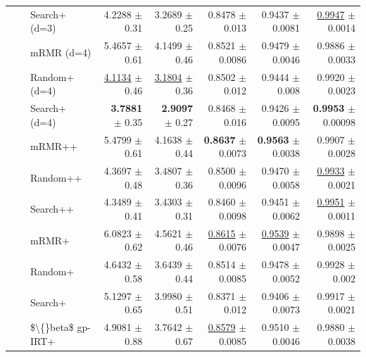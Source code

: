 \begin{longtable}{llp{}rrrrr}
 &  & Search+ (d=3) & 4.2288 {\scriptsize $\pm$ 0.31} & 3.2689 {\scriptsize $\pm$ 0.25} & 0.8478 {\scriptsize $\pm$ 0.013} & 0.9437 {\scriptsize $\pm$ 0.0081} & \underline{0.9947} {\scriptsize $\pm$ 0.0014} \\
 &  & mRMR (d=4) & 5.4657 {\scriptsize $\pm$ 0.61} & 4.1499 {\scriptsize $\pm$ 0.46} & 0.8521 {\scriptsize $\pm$ 0.0086} & 0.9479 {\scriptsize $\pm$ 0.0046} & 0.9886 {\scriptsize $\pm$ 0.0033} \\
 &  & Random+ (d=4) & \underline{4.1134} {\scriptsize $\pm$ 0.46} & \underline{3.1804} {\scriptsize $\pm$ 0.36} & 0.8502 {\scriptsize $\pm$ 0.012} & 0.9444 {\scriptsize $\pm$ 0.008} & 0.9920 {\scriptsize $\pm$ 0.0023} \\
 &  & Search+ (d=4) & \textbf{3.7881} {\scriptsize $\pm$ 0.35} & \textbf{2.9097} {\scriptsize $\pm$ 0.27} & 0.8468 {\scriptsize $\pm$ 0.016} & 0.9426 {\scriptsize $\pm$ 0.0095} & \textbf{0.9953} {\scriptsize $\pm$ 0.00098} \\
 &  & mRMR++ & 5.4799 {\scriptsize $\pm$ 0.61} & 4.1638 {\scriptsize $\pm$ 0.44} & \textbf{0.8637} {\scriptsize $\pm$ 0.0073} & \textbf{0.9563} {\scriptsize $\pm$ 0.0038} & 0.9907 {\scriptsize $\pm$ 0.0028} \\
 &  & Random++ & 4.3697 {\scriptsize $\pm$ 0.48} & 3.4807 {\scriptsize $\pm$ 0.36} & 0.8500 {\scriptsize $\pm$ 0.0096} & 0.9470 {\scriptsize $\pm$ 0.0058} & \underline{0.9933} {\scriptsize $\pm$ 0.0021} \\
 &  & Search++ & 4.3489 {\scriptsize $\pm$ 0.41} & 3.4303 {\scriptsize $\pm$ 0.31} & 0.8460 {\scriptsize $\pm$ 0.0098} & 0.9451 {\scriptsize $\pm$ 0.0062} & \underline{0.9951} {\scriptsize $\pm$ 0.0011} \\
 &  & mRMR+ & 6.0823 {\scriptsize $\pm$ 0.62} & 4.5621 {\scriptsize $\pm$ 0.46} & \underline{0.8615} {\scriptsize $\pm$ 0.0076} & \underline{0.9539} {\scriptsize $\pm$ 0.0047} & 0.9898 {\scriptsize $\pm$ 0.0025} \\
 &  & Random+ & 4.6432 {\scriptsize $\pm$ 0.58} & 3.6439 {\scriptsize $\pm$ 0.44} & 0.8514 {\scriptsize $\pm$ 0.0085} & 0.9478 {\scriptsize $\pm$ 0.0052} & 0.9928 {\scriptsize $\pm$ 0.002} \\
 &  & Search+ & 5.1297 {\scriptsize $\pm$ 0.65} & 3.9980 {\scriptsize $\pm$ 0.51} & 0.8371 {\scriptsize $\pm$ 0.012} & 0.9406 {\scriptsize $\pm$ 0.0073} & 0.9917 {\scriptsize $\pm$ 0.0021} \\
 &  & \$\textbackslash\{\}beta\$ gp-IRT+ & 4.9081 {\scriptsize $\pm$ 0.88} & 3.7642 {\scriptsize $\pm$ 0.67} & \underline{0.8579} {\scriptsize $\pm$ 0.0085} & 0.9510 {\scriptsize $\pm$ 0.0046} & 0.9880 {\scriptsize $\pm$ 0.0038} \\

\end{longtable}
